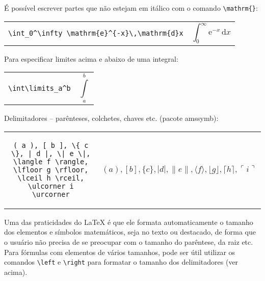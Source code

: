 \documentclass{scrartcl}
\begin{document}
\bigskip

É possível escrever partes que não estejam em itálico com o comando \verb+\mathrm{}+\index{\verb+\mathrm{}+}:


\begin{tabular}{cc}
\begin{minipage}{0.4\textwidth}
\verb+\int_0^\infty \mathrm{e}^{-x}\,\mathrm{d}x+
\end{minipage} & \begin{minipage}{0.4\textwidth}\[ \int_0^\infty \mathrm{e}^{-x}\,\mathrm{d}x \] \end{minipage}
\end{tabular}

\bigskip

Para especificar limites acima e abaixo de uma integral:


\begin{tabular}{cc}
\begin{minipage}{0.4\textwidth}
\verb+\int\limits_a^b+
\end{minipage} & \begin{minipage}{0.4\textwidth}\[ \int\limits_a^b \] \end{minipage}
\end{tabular}


Delimitadores -- parênteses, colchetes, chaves etc. (pacote \textsf{amssymb}):

\bigskip

\begin{tabular}{cl}
\begin{minipage}{0.5\textwidth}
\begin{verbatim}
( a ), [ b ], \{ c \}, | d |, \| e \|,
\langle f \rangle, \lfloor g \rfloor,
\lceil h \rceil, \ulcorner i \urcorner
\end{verbatim}
\end{minipage} & 
\begin{minipage}{0.3\textwidth}
\begin{displaymath}
( a ), [ b ], \{ c \}, | d |, \| e \|,
\langle f \rangle, \lfloor g \rfloor,
\lceil h \rceil, \ulcorner i \urcorner 
\end{displaymath}
 \end{minipage}
\end{tabular}

\bigskip


Uma das praticidades do \LaTeX{} é que ele formata automaticamente o tamanho dos elementos e símbolos matemáticos, seja no texto ou destacado, de forma que o usuário não precisa de se preocupar com o tamanho do parêntese, da raiz etc. Para fórmulas com elementos de vários tamanhos, pode ser útil utilizar os comandos \verb+\left+ \index{\verb+\left+}e \verb+\right+\index{\verb+\right+} para formatar o tamanho dos delimitadores (ver acima). 
\end{document}
